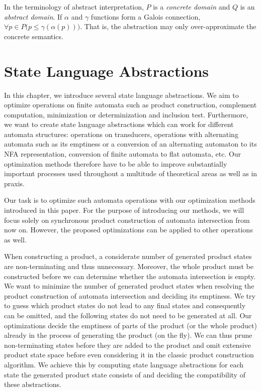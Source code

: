 In the terminology of abstract interpretation, $P$ is a \emph{concrete domain} and $Q$ is an \emph{abstract domain}. If $\alpha$ and $\gamma$ functions form a Galois connection, $\forall p \in P \bigr( p \leq \gamma(\alpha(p)) \bigr)$. That is, the abstraction may only over-approximate the concrete semantics.


\chapter{State Language Abstractions}

In this chapter, we introduce several state language abstractions. We aim to optimize operations on finite automata such as product construction, complement computation, minimization or determinization and inclusion test. Furthermore, we want to create state language abstractions which can work for different automata structures: operations on transducers, operations with alternating automata such as its emptiness or a conversion of an alternating automaton to its NFA representation, conversion of finite automata to flat automata, etc. Our optimization methods therefore have to be able to improve substantially important processes used throughout a multitude of theoretical areas as well as in praxis.

Our task is to optimize such automata operations with our optimization methods introduced in this paper. For the purpose of introducing our methods, we will focus solely on synchronous product construction of automata intersection from now on. However, the proposed optimizations can be applied to other operations as well.

When constructing a product, a considerate number of generated product states are non-terminating and thus unnecessary. Moreover, the whole product must be constructed before we can determine whether the automata intersection is empty. We want to minimize the number of generated product states when resolving the product construction of automata intersection and deciding its emptiness. We try to guess which product states do not lead to any final states and consequently can be omitted, and the following states do not need to be generated at all. Our optimizations decide the emptiness of parts of the product (or the whole product) already in the process of generating the product (on the fly). We can thus prune non-terminating states before they are added to the product and omit extensive product state space before even considering it in the classic product construction algorithm. We achieve this by computing state language abstractions for each state the generated product state consists of and deciding the compatibility of these abstractions.

